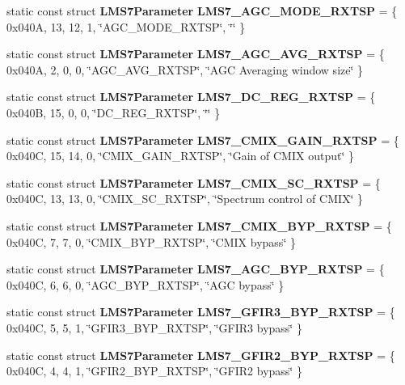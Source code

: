 \begin{DoxyCompactItemize}
\item 
static const struct {\bf L\+M\+S7\+Parameter} {\bf L\+M\+S7\+\_\+\+A\+G\+C\+\_\+\+M\+O\+D\+E\+\_\+\+R\+X\+T\+SP} = \{ 0x040\+A, 13, 12, 1, \char`\"{}\+A\+G\+C\+\_\+\+M\+O\+D\+E\+\_\+\+R\+X\+T\+S\+P\char`\"{}, \char`\"{}\char`\"{} \}
\item 
static const struct {\bf L\+M\+S7\+Parameter} {\bf L\+M\+S7\+\_\+\+A\+G\+C\+\_\+\+A\+V\+G\+\_\+\+R\+X\+T\+SP} = \{ 0x040\+A, 2, 0, 0, \char`\"{}\+A\+G\+C\+\_\+\+A\+V\+G\+\_\+\+R\+X\+T\+S\+P\char`\"{}, \char`\"{}\+A\+G\+C Averaging window size\char`\"{} \}
\item 
static const struct {\bf L\+M\+S7\+Parameter} {\bf L\+M\+S7\+\_\+\+D\+C\+\_\+\+R\+E\+G\+\_\+\+R\+X\+T\+SP} = \{ 0x040\+B, 15, 0, 0, \char`\"{}\+D\+C\+\_\+\+R\+E\+G\+\_\+\+R\+X\+T\+S\+P\char`\"{}, \char`\"{}\char`\"{} \}
\item 
static const struct {\bf L\+M\+S7\+Parameter} {\bf L\+M\+S7\+\_\+\+C\+M\+I\+X\+\_\+\+G\+A\+I\+N\+\_\+\+R\+X\+T\+SP} = \{ 0x040\+C, 15, 14, 0, \char`\"{}\+C\+M\+I\+X\+\_\+\+G\+A\+I\+N\+\_\+\+R\+X\+T\+S\+P\char`\"{}, \char`\"{}\+Gain of C\+M\+I\+X output\char`\"{} \}
\item 
static const struct {\bf L\+M\+S7\+Parameter} {\bf L\+M\+S7\+\_\+\+C\+M\+I\+X\+\_\+\+S\+C\+\_\+\+R\+X\+T\+SP} = \{ 0x040\+C, 13, 13, 0, \char`\"{}\+C\+M\+I\+X\+\_\+\+S\+C\+\_\+\+R\+X\+T\+S\+P\char`\"{}, \char`\"{}\+Spectrum control of C\+M\+I\+X\char`\"{} \}
\item 
static const struct {\bf L\+M\+S7\+Parameter} {\bf L\+M\+S7\+\_\+\+C\+M\+I\+X\+\_\+\+B\+Y\+P\+\_\+\+R\+X\+T\+SP} = \{ 0x040\+C, 7, 7, 0, \char`\"{}\+C\+M\+I\+X\+\_\+\+B\+Y\+P\+\_\+\+R\+X\+T\+S\+P\char`\"{}, \char`\"{}\+C\+M\+I\+X bypass\char`\"{} \}
\item 
static const struct {\bf L\+M\+S7\+Parameter} {\bf L\+M\+S7\+\_\+\+A\+G\+C\+\_\+\+B\+Y\+P\+\_\+\+R\+X\+T\+SP} = \{ 0x040\+C, 6, 6, 0, \char`\"{}\+A\+G\+C\+\_\+\+B\+Y\+P\+\_\+\+R\+X\+T\+S\+P\char`\"{}, \char`\"{}\+A\+G\+C bypass\char`\"{} \}
\item 
static const struct {\bf L\+M\+S7\+Parameter} {\bf L\+M\+S7\+\_\+\+G\+F\+I\+R3\+\_\+\+B\+Y\+P\+\_\+\+R\+X\+T\+SP} = \{ 0x040\+C, 5, 5, 1, \char`\"{}\+G\+F\+I\+R3\+\_\+\+B\+Y\+P\+\_\+\+R\+X\+T\+S\+P\char`\"{}, \char`\"{}\+G\+F\+I\+R3 bypass\char`\"{} \}
\item 
static const struct {\bf L\+M\+S7\+Parameter} {\bf L\+M\+S7\+\_\+\+G\+F\+I\+R2\+\_\+\+B\+Y\+P\+\_\+\+R\+X\+T\+SP} = \{ 0x040\+C, 4, 4, 1, \char`\"{}\+G\+F\+I\+R2\+\_\+\+B\+Y\+P\+\_\+\+R\+X\+T\+S\+P\char`\"{}, \char`\"{}\+G\+F\+I\+R2 bypass\char`\"{} \}

\end{DoxyCompactItemize}
